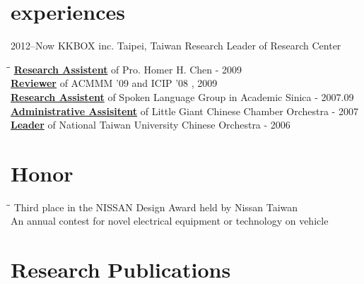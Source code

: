 \documentclass{friggeri-cv}
\begin{document}
\section{experiences}
\begin{entrylist}
\entry
{2012--Now}
{KKBOX inc.}
{Taipei, Taiwan}
{Research Leader of Research Center} \\


    \vspace{-0.1in}
    \begin{tabbing}
        \hspace{0.3in}\= \hspace{4.6in}\= \kill %
        \underline{\textbf{Research Assistent}} of Pro. Homer H. Chen                          \> - 2009 \\
        \underline{\textbf{Reviewer}} of ACMMM '09 and ICIP '08              \>, 2009 \\
        \underline{\textbf{Research Assistent}} of Spoken Language Group in Academic Sinica     \> - 2007.09 \\
        \underline{\textbf{Administrative Assisitent}} of Little Giant Chinese Chamber Orchestra    \> - 2007 \\
        \underline{\textbf{Leader}} of National Taiwan University Chinese Orchestra              \> - 2006 \\
    \end{tabbing}\vspace{-20pt}      %


\section{Honor}
	\vspace{-0.1in}
	\begin{tabbing}
	\hspace{0.3in}\= \hspace{4.6in}\= \kill
	Third place in the NISSAN Design Award held by Nissan Taiwan \> \\
	\> An annual contest for novel electrical equipment or technology on vehicle \\
	\end{tabbing}\vspace{-20pt}

\section{Research Publications}
	\vspace{-0.1in}

\end{entrylist}
\end{document}
